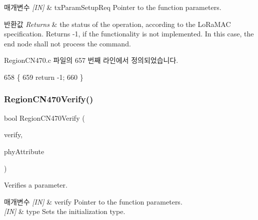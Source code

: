 \begin{DoxyParams}{매개변수}
{\em \mbox{[}\+I\+N\mbox{]}} & tx\+Param\+Setup\+Req Pointer to the function parameters.\\
\hline
\end{DoxyParams}

\begin{DoxyRetVals}{반환값}
{\em Returns} & the status of the operation, according to the Lo\+Ra\+M\+AC specification. Returns -\/1, if the functionality is not implemented. In this case, the end node shall not process the command. \\
\hline
\end{DoxyRetVals}


Region\+C\+N470.\+c 파일의 657 번째 라인에서 정의되었습니다.


\begin{DoxyCode}
658 \{
659     \textcolor{keywordflow}{return} -1;
660 \}
\end{DoxyCode}
\mbox{\label{group___r_e_g_i_o_n_c_n470_ga7d7ddf394ddb8a6ac2d7cb5fea7ad745}} 
\subsubsection{\texorpdfstring{Region\+C\+N470\+Verify()}{RegionCN470Verify()}}
{\footnotesize\ttfamily bool Region\+C\+N470\+Verify (\begin{DoxyParamCaption}\item[{\mbox{\hyperlink{group___r_e_g_i_o_n_ga966d97bc2f25df1c09e92e60ef652276}{Verify\+Params\+\_\+t}} $\ast$}]{verify,  }\item[{\mbox{\hyperlink{group___r_e_g_i_o_n_ga9445b07fdf77581ecfaf389970e635f8}{Phy\+Attribute\+\_\+t}}}]{phy\+Attribute }\end{DoxyParamCaption})}



Verifies a parameter. 


\begin{DoxyParams}{매개변수}
{\em \mbox{[}\+I\+N\mbox{]}} & verify Pointer to the function parameters.\\
\hline
{\em \mbox{[}\+I\+N\mbox{]}} & type Sets the initialization type.\\
\hline
\end{DoxyParams}

